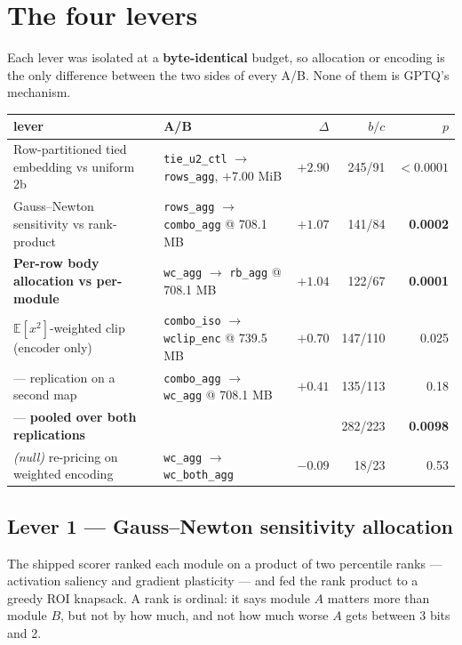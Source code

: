 \documentclass[11pt]{article}
\newcommand{\code}[1]{\texttt{#1}}
\newcommand{\best}[1]{\textbf{#1}}
\begin{document}
\section{The four levers}

Each lever was isolated at a \textbf{byte-identical} budget, so allocation or encoding is the only
difference between the two sides of every A/B. None of them is GPTQ's mechanism.

\begin{center}\footnotesize
\begin{tabular}{@{}llrrr@{}}
\toprule
lever & A/B & $\Delta$ & $b/c$ & $p$ \\
\midrule
Row-partitioned tied embedding vs uniform 2b & \code{tie\_u2\_ctl} $\to$ \code{rows\_agg}, $+7.00$ MiB & \best{$+2.90$} & 245/91 & \best{$<0.0001$} \\
Gauss--Newton sensitivity vs rank-product & \code{rows\_agg} $\to$ \code{combo\_agg} @ 708.1 MB & \best{$+1.07$} & 141/84 & \best{0.0002} \\
\textbf{Per-row body allocation vs per-module} & \code{wc\_agg} $\to$ \code{rb\_agg} @ 708.1 MB & \best{$+1.04$} & 122/67 & \best{0.0001} \\
$\mathbb{E}[x^2]$-weighted clip (encoder only) & \code{combo\_iso} $\to$ \code{wclip\_enc} @ 739.5 MB & $+0.70$ & 147/110 & 0.025 \\
\quad --- replication on a second map & \code{combo\_agg} $\to$ \code{wc\_agg} @ 708.1 MB & $+0.41$ & 135/113 & 0.18 \\
\quad --- \textbf{pooled over both replications} & & & 282/223 & \best{0.0098} \\
\midrule
\emph{(null)} re-pricing on weighted encoding & \code{wc\_agg} $\to$ \code{wc\_both\_agg} & $-0.09$ & 18/23 & 0.53 \\
\bottomrule
\end{tabular}
\end{center}

\subsection{Lever 1 --- Gauss--Newton sensitivity allocation}

The shipped scorer ranked each module on a product of two percentile ranks --- activation
saliency and gradient plasticity --- and fed the rank product to a greedy ROI knapsack. A rank is
ordinal: it says module $A$ matters more than module $B$, but not by how much, and not how much
worse $A$ gets between 3 bits and 2.
\end{document}
